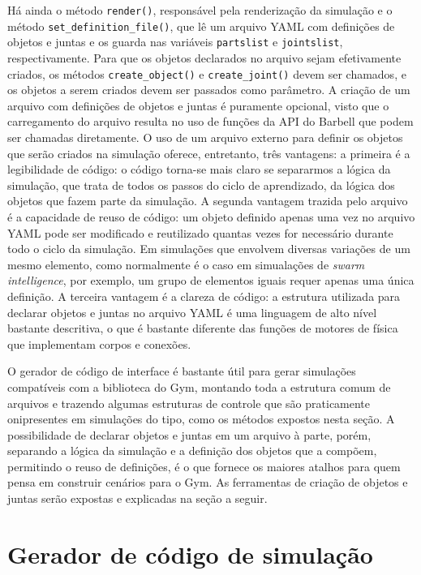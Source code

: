 \documentclass[cic,tc]{iiufrgs}
\begin{document}
Há ainda o método \texttt{render()}, responsável pela renderização da simulação e o
método \texttt{set\_definition\_file()}, que lê um arquivo YAML com definições
de objetos e juntas e os guarda nas variáveis \texttt{partslist} e \texttt{jointslist},
respectivamente. Para que os objetos declarados no arquivo sejam efetivamente criados,
os métodos \texttt{create\_object()} e \texttt{create\_joint()} devem ser chamados,
e os objetos a serem criados devem ser passados como parâmetro. A criação de
um arquivo com definições de objetos e juntas é puramente opcional, visto que
o carregamento do arquivo resulta no uso de funções da API do Barbell que
podem ser chamadas diretamente. O uso de um arquivo externo para definir os
objetos que serão criados na simulação oferece, entretanto, três vantagens: a
primeira é a legibilidade de código: o código torna-se mais claro se separarmos
a lógica da simulação, que trata de todos os passos do ciclo de aprendizado, da
lógica dos objetos que fazem parte da simulação. A segunda vantagem trazida pelo
arquivo é a capacidade de reuso de código: um objeto definido apenas uma vez
no arquivo YAML pode ser modificado e reutilizado quantas vezes for necessário
durante todo o ciclo da simulação. Em simulações que envolvem diversas variações
de um mesmo elemento, como normalmente é o caso em simualações de \textit{swarm
intelligence}, por exemplo, um grupo de elementos iguais requer apenas uma
única definição. A terceira vantagem é a clareza de código: a estrutura utilizada
para declarar objetos e juntas no arquivo YAML é uma linguagem de alto nível
bastante descritiva, o que é bastante diferente das funções de motores de física
que implementam corpos e conexões.

O gerador de código de interface é bastante útil para gerar simulações compatíveis
com a biblioteca do Gym, montando toda a estrutura comum de arquivos e trazendo
algumas estruturas de controle que são praticamente onipresentes em simulações
do tipo, como os métodos expostos nesta seção. A possibilidade de declarar objetos
e juntas em um arquivo à parte, porém, separando a lógica da simulação e a definição
dos objetos que a compõem, permitindo o reuso de definições, é o que fornece os
maiores atalhos para quem pensa em construir cenários para o Gym. As ferramentas
de criação de objetos e juntas serão expostas e explicadas na seção a seguir.

\section{Gerador de código de simulação}
\end{document}
